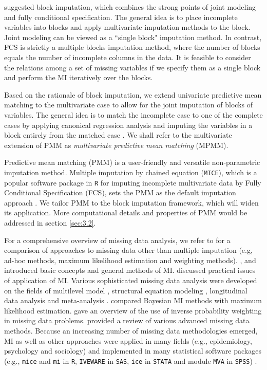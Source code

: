 	\citet[section 4.7.2]{Buuren2018} suggested block imputation, which combines the strong points of joint modeling and fully conditional specification. The general idea is to place incomplete variables into blocks and apply multivariate imputation methods to the block. Joint modeling can be viewed as a ``single block" imputation method. In contrast, FCS is strictly a multiple blocks imputation method, where the number of blocks equals the number of incomplete columns in the data. It is feasible to consider the relations among a set of missing variables if we specify them as a single block and perform the MI iteratively over the blocks. 
	
	Based on the rationale of block imputation, we extend univariate predictive mean matching to the multivariate case to allow for the joint imputation of blocks of variables. The general idea is to match the incomplete case to one of the complete cases by applying canonical regression analysis and imputing the variables in a block entirely from the matched case \citep{little1988missing}. We shall refer to the multivariate extension of PMM as \emph{multivariate predictive mean matching} (MPMM).  
	
	Predictive mean matching (PMM) is a user-friendly and versatile non-parametric imputation method. Multiple imputation by chained equation (\texttt{MICE}), which is a popular software package in \texttt{R} for imputing incomplete multivariate data by Fully Conditional Specification (FCS), sets the PMM as the default imputation approach \citep{Buuren2011}. We tailor PMM to the block imputation framework, which will widen its application. More computational details and properties of PMM would be addressed in section \ref{sec:3.2}.       
	
	
	For a comprehensive overview of missing data analysis, we refer to \citet{little2019statistical} for a comparison of approaches to missing data other than multiple imputation (e.g, ad-hoc methods, maximum likelihood estimation and weighting methods). \citet{schafer1999multiple}, \citet{sinharay2001use} and \citet{allison2001missing} introduced basic concepts and general methods of MI. \citet{schafer2002missing} discussed practical issues of application of MI. Various sophisticated missing data analysis were developed on the fields of multilevel model \citep{longford2001multilevel}, structural equation modeling \citep{olinsky2003comparative, allison2003missing}, longitudinal data analysis \citep{twisk2002attrition, demirtas2004modeling} and meta-analysis \citep{pigott2001missing}. \citet{schafer2003multiple} compared Bayesian MI methods with maximum likelihood estimation. \citet{seaman2013review} gave an overview of the use of inverse probability weighting in missing data problems. \citet{ibrahim2005missing} provided a review of various advanced missing data methods. Because an increasing number of missing data methodologies emerged, MI as well as other approaches were applied in many fields (e.g., epidemiology, psychology and sociology) and implemented in many statistical software packages (e.g., \texttt{mice} and \texttt{mi} in \texttt{R}, \texttt{IVEWARE} in \texttt{SAS}, \texttt{ice} in \texttt{STATA} and module \texttt{MVA} in \texttt{SPSS}) \citep{Buuren2011}.
	

